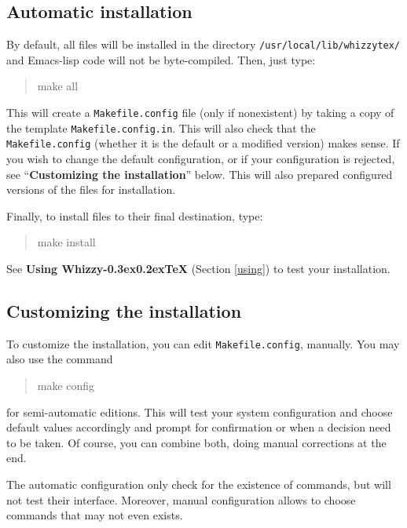 \documentclass[12pt]{article}
\makeatletter
\let \lst \verb
\def \whizzy {{Whizzy\kern -0.3ex\raise 0.2ex\hbox{\let \@\relax\TeX}}}
\makeatother
\begin{document}
\subsection {Automatic installation}

\label {install/automatic}

By default, all files will be installed in the directory
\lst"/usr/local/lib/whizzytex/" and Emacs-lisp code will not be 
byte-compiled. Then, just type: 
\begin{quote}
\begin{tt}
make all
\end{tt}
\end{quote}
This will create a \lst"Makefile.config" file (only if nonexistent) by
taking a copy of the template \lst"Makefile.config.in". This will also check
that the \lst"Makefile.config" (whether it is the default or a modified
version) makes sense. If you wish to change the default configuration, or if
your configuration is rejected, see ``{\bf Customizing the installation}''
below. This will also prepared configured versions of the
files for installation.

Finally, to install files to their final destination, type:
\begin{quote}
\begin{tt}
make install
\end{tt}
\end{quote}
See {\bf Using {\whizzy}} (Section \ref {using}) to test your installation.

\subsection {Customizing the installation}

To customize the installation, you can edit 
\lst"Makefile.config", manually.
You may also use the command
\begin{quote}
\begin{tt}
make config
\end{tt}
\end{quote}
for semi-automatic editions. This will test your system configuration and 
choose default values accordingly and prompt for confirmation or when
a decision need to be taken. Of course, you can combine both, doing manual
corrections at the end.

The automatic configuration only check for the existence of commands, but
will not test their interface. Moreover, manual configuration allows to
choose commands that may not even exists.
\end{document}
